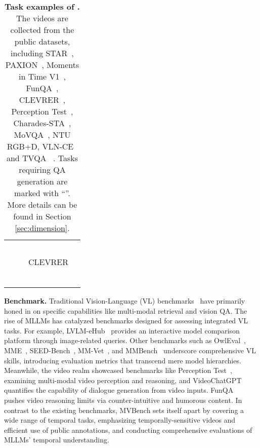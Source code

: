 \begin{table*}[tp]
{\begin{tabular}{c|c|c|l}
        \hhline{~|-|-|-}
        ~ &  &  &  \\
        ~ & ~ & ~ &   \\
        ~ & ~ & ~ &  \\
        \Xhline{1.0pt}
        \end{tabular}
    }
    \vspace{-0.3cm}
    \caption{
    \textbf{Task examples of \BenchName.}
    The videos are collected from the public datasets, including STAR~\cite{star}, PAXION~\cite{paxion}, Moments in Time V1~\cite{mit}, FunQA~\cite{funqa}, CLEVRER~\cite{clevrer}, Perception Test~\cite{perception_test}, Charades-STA~\cite{charades_sta}, MoVQA~\cite{movqa}, NTU RGB+D\cite{ntu_rgbd}, VLN-CE~\cite{vln_ce} and TVQA ~\cite{tvqa}.
    Tasks requiring QA generation are marked with ``\red{$\ddag$}''.
    More details can be found in Section \ref{sec:dimension}.
    }
    \label{tab:task_dimension}
    \vspace{-0.3cm}
\end{table*}
\noindent\textbf{Benchmark.}
Traditional Vision-Language (VL) benchmarks~\cite{k400,sth,msrvtt,nextqa,msrvtt_qa} have primarily honed in on specific capabilities like multi-modal retrieval and vision QA. 
The rise of MLLMs has catalyzed benchmarks designed for assessing integrated VL tasks. 
For example, LVLM-eHub~\cite{lvlm_ehub} provides an interactive model comparison platform through image-related queries. 
Other benchmarks such as OwlEval~\cite{mplug-owl}, MME~\cite{mme}, SEED-Bench~\cite{seedbench}, MM-Vet~\cite{mmvet}, and MMBench~\cite{mmbench} underscore comprehensive VL skills, introducing evaluation metrics that transcend mere model hierarchies.
Meanwhile, the video realm showcased benchmarks like Perception Test~\cite{perception_test}, examining multi-modal video perception and reasoning, and VideoChatGPT~\cite{videochatgpt} quantifies the capability of dialogue generation from video inputs.
FunQA~\cite{funqa} pushes video reasoning limits via counter-intuitive and humorous content.
In contrast to the existing benchmarks,
MVBench sets itself apart by covering a wide range of temporal tasks, 
emphasizing temporally-sensitive videos and efficient use of public annotations, 
and conducting comprehensive evaluations of MLLMs' temporal understanding.
